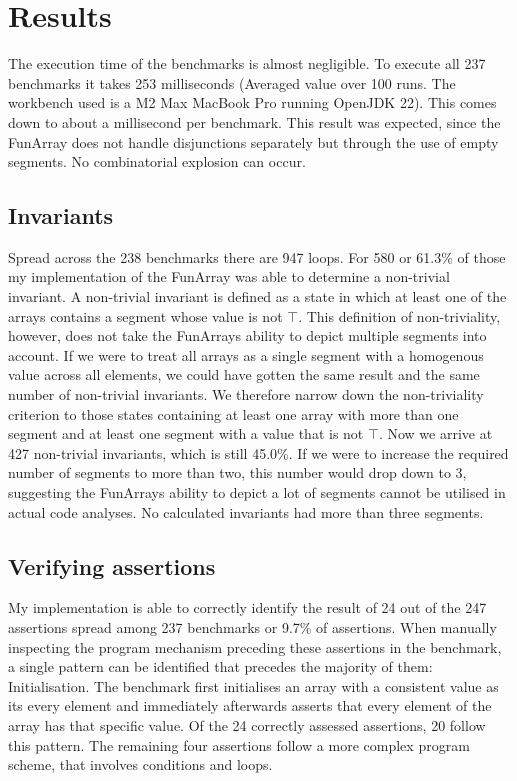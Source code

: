 \documentclass{report}
\begin{document}
\section{Results}

The execution time of the benchmarks is almost negligible. To execute all 237 benchmarks it takes 253 milliseconds (Averaged value over 100 runs. The workbench used is a M2 Max MacBook Pro running OpenJDK 22). This comes down to about a millisecond per benchmark. This result was expected, since the FunArray does not handle disjunctions separately but through the use of empty segments. No combinatorial explosion can occur.

\subsection{Invariants}
Spread across the 238 benchmarks there are 947 loops. For 580 or 61.3\% of those my implementation of the FunArray was able to determine a non-trivial invariant. A non-trivial invariant is defined as a state in which at least one of the arrays contains a segment whose value is not $\top$.
This definition of non-triviality, however, does not take the FunArrays ability to depict multiple segments into account. If we were to treat all arrays as a single segment with a homogenous value across all elements, we could have gotten the same result and the same number of non-trivial invariants. We therefore narrow down the non-triviality criterion to those states containing at least one array with more than one segment and at least one segment with a value that is not $\top$. Now we arrive at 427 non-trivial invariants, which is still 45.0\%. 
If we were to increase the required number of segments to more than two, this number would drop down to 3, suggesting the FunArrays ability to depict a lot of segments cannot be utilised in actual code analyses. No calculated invariants had more than three segments.

\subsection{Verifying assertions}

My implementation is able to correctly identify the result of 24 out of the 247 assertions spread among 237 benchmarks or 9.7\% of assertions. When manually inspecting the program mechanism preceding these assertions in the benchmark, a single pattern can be identified that precedes the majority of them: Initialisation. The benchmark first initialises an array with a consistent value as its every element and immediately afterwards asserts that every element of the array has that specific value. Of the 24 correctly assessed assertions, 20 follow this pattern. The remaining four assertions follow a more complex program scheme, that involves conditions and loops.
\end{document}

